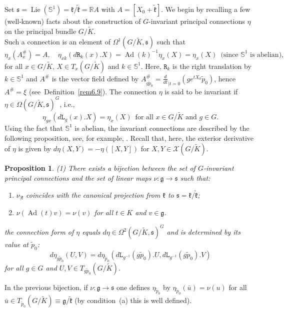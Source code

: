 \documentclass[a4paper,reqno]{amsart}
\newtheorem{prop}[thm]{Proposition}
\theoremstyle{definition}
\theoremstyle{remark}
\theoremstyle{plain}
\numberwithin{equation}{section}
\newcommand{\R}{{\mathbb{R}}}
\newcommand{\bbS}{{\mathbb{S}}}
\newcommand{\calX}{{\mathcal{X}}}
\newcommand{\g}{{\mathfrak{g}}}  %
\newcommand{\fk}{{\mathfrak{k}}}  \renewcommand{\k}{{\mathfrak{k}}}
\newcommand{\fs}{{\mathfrak{s}}}
\def\Lie{\operatorname {Lie}}
\DeclareMathOperator{\Ad}{{Ad}}
\newcommand{\Kt}{{\widetilde{K}}}
\newcommand{\wk}{{\widetilde{\mathfrak{k}}}}
\newcommand{\wm}{{\widetilde{\mathfrak{m}}}}
\newcommand{\wpzero}{{\tilde{p}_0}}
\newcommand{\ltr}{\mathtt{L}}
\newcommand{\rtr}{\mathtt{R}}
\begin{document}
Set $\fs = \Lie(\bbS^1) = \fk/\wk = \R A$ with $A = [X_0 + \wk]$.
We begin by recalling a few (well-known) facts  about the
construction of $G$-invariant principal connections $\eta$ on the
principal bundle $G/\Kt$.\\
Such a  connection is an element of $\Omega^1(G/\Kt,\fs)$ such that
\begin{equation*} \label{eq4.1}
\eta_x(A^\#_x) = A, \quad \eta_{xk}(d\rtr_{k}(x).X) =
\Ad(k)^{-1}\eta_x(X) = \eta_x(X) \ \; \text{(since $\bbS^1$ is abelian)},
\end{equation*}
 for all $x \in G/\Kt$, $X \in T_x(G/\Kt)$ and $k \in \bbS^1$. Here,
 $\rtr_k$ is the right translation by $k \in \bbS^1$ and $A^\#$ is the
 vector field defined by $A^\#_{g\wpzero} = \frac{d}{dt}_{\mid t
   =0} (g e^{tX_0} \wpzero)$, hence $A^\# =\xi$
 (see~Definition~\ref{rem6.9}). %
The connection $\eta$ is said to be invariant if $\eta \in
\Omega(G/\Kt,\fs)^G$, i.e.,
\[
\eta_{gx}(d\ltr_g(x).X) = \eta_x(X) \ \; \text{for all $x \in
  G/\Kt$ and $g \in G$.}
\]
Using the fact that $\bbS^1$ is abelian, the invariant connections are described
by the following proposition, see, for example, \cite[pages 18 \&
39, Theorem~1.4.5]{CS}. Recall that, here,  the
exterior derivative of $\eta$ is given by
$d\eta(X,Y) = -\eta([X,Y])$ for $X,Y \in \calX(G/\Kt)$.

\begin{prop}
  \label{prop4.1}
  {\rm (1)} There exists a bijection  between the set of
  $G$-invariant principal connections and the set of linear maps $\nu : \g \to
  \fs$ such that:
  \begin{enumerate}[{\rm  \indent (a)}]
  \item  $\nu_ {\mid \fk}$ coincides with the canonical
    projection from $\fk$ to $\fs = \fk/\wk$;
    \item $\nu(\Ad(t)v) = \nu(v)$ for all $t \in K$ and $v \in \g$.
    \end{enumerate}
 the connection form of $\eta$ equals $d\eta \in
    \Omega^2(G/\Kt,\fs)^G$ and is determined by its value at
    $\wpzero$:
\[
d\eta_{g\wpzero}(U,V) = d\eta_\wpzero(d\ltr_{g^{-1}}(g\wpzero).U,d\ltr_{g^{-1}}(g\wpzero).V)
\]
for all $g \in G$ and $U,V \in T_{g\wpzero} (G/\Kt)$. 
\end{prop}

In the previous bijection, if $\nu : \g \to \fs$ one defines
$\eta_\wpzero$  by $\eta_\wpzero(\bar{u})= \nu(u)$ for all
$\bar{u} \in T_\wpzero (G/\Kt) \equiv \g/\wk$ (by condition~(a) this is well
defined). 
\end{document}
